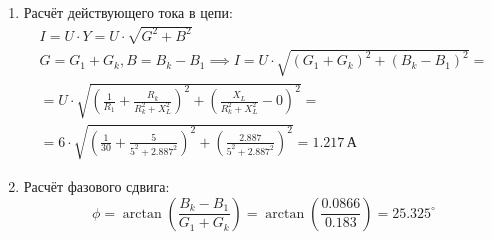 \begin{enumerate}
	\item Расчёт действующего тока в цепи:
	      \[
		      \begin{gathered}
			      I = U \cdot Y = U \cdot \sqrt{G^2 + B^2} \\
			      G = G_1+G_k, B = B_k-B_1 \implies I = U \cdot \sqrt{(G_1+G_k)^2+(B_k-B_1)^2} = \\
			      = U \cdot \sqrt{\left(\frac{1}{R_1}+\frac{R_k}{R_k^2+X_L^2}\right)^2+\left(\frac{X_L}{R_k^2+X_L^2}-0\right)^2} = \\
			      = 6 \cdot \sqrt{\left(\frac{1}{30}+\frac{5}{5^2+2.887^2}\right)^2+\left(\frac{2.887}{5^2+2.887^2}\right)^2} = 1.217 \, \text{А}
		      \end{gathered}
	      \]
	\item Расчёт фазового сдвига:
	      \[
		      \phi = \arctan\left(\frac{B_k-B_1}{G_1+G_k}\right) = \arctan\left(\frac{0.0866}{0.183}\right) = 25.325^{\circ}
	      \]
\end{enumerate}
